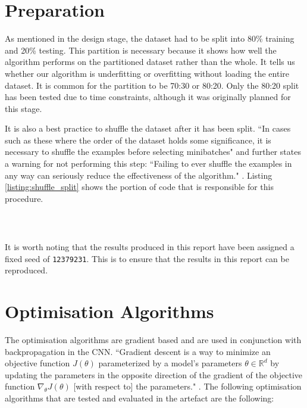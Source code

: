 \documentclass[report, 11pt, oneside]{dissertation}
\begin{document}
\section{Preparation}

As mentioned in the design stage, the dataset had to be split into 80\% training and 20\% testing. This partition is necessary because it shows how well the algorithm performs on the partitioned dataset rather than the whole. It tells us whether our algorithm is underfitting or overfitting without loading the entire dataset. It is common for the partition to be 70:30 or 80:20. Only the 80:20 split has been tested due to time constraints, although it was originally planned for this stage.

 It is also a best practice to shuffle the dataset after it has been split. ``In cases such as these where the order of the dataset holds some significance, it is necessary to shuffle the examples before selecting minibatches" \citep[271]{Goodfellow-et-al-2016} and further states a warning for not performing this step: ``Failing to ever shuffle the examples in any way can seriously reduce the effectiveness of the algorithm." \citep[271]{Goodfellow-et-al-2016}. Listing \ref{listing:shuffle_split} shows the portion of code that is responsible for this procedure.

\ \ \ 

\inputminted[frame=single, firstline=222, lastline=242, baselinestretch=1, linenos, breaklines]{python}{train.py}
\label{listing:shuffle_split}

It is worth noting that the results produced in this report have been assigned a fixed seed of \texttt{12379231}. This is to ensure that the results in this report can be reproduced.

\section{Optimisation Algorithms}

The optimisation algorithms are gradient based and are used in conjunction with backpropagation in the CNN. ``Gradient descent is a way to minimize an objective function $J(\theta)$ parameterized by a model's parameters $ \theta \in \mathbb{R}^d $ by updating the parameters in the opposite direction of the gradient of the objective function $ \nabla_\theta J(\theta) $ [with respect to] the parameters." \citep[1]{Ruder:2016tr}. The following optimisation algorithms that are tested and evaluated in the artefact are the following:
\end{document}

